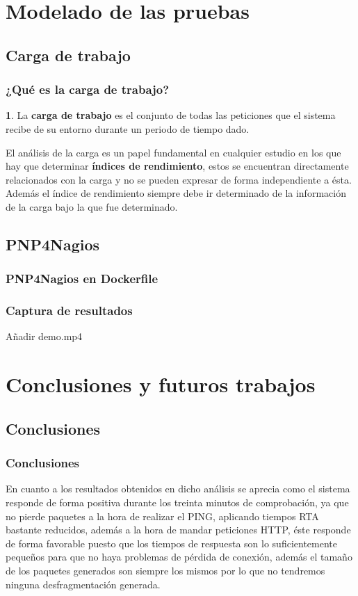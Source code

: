 \documentclass{beamer}
\theoremstyle{plain}
\theoremstyle{definition}
\newtheorem{defn}[thm]{}
\theoremstyle{plain}
\theoremstyle{definition}
\theoremstyle{remark}
\theoremstyle{definition}
\begin{document}
\section{Modelado de las pruebas} %
\subsection{Carga de trabajo}
\begin{frame}
	\frametitle{¿Qué es la carga de trabajo?}
	\begin{defn}
		La \textbf{carga de trabajo} es el conjunto de todas las peticiones que el sistema recibe de su entorno
		durante un periodo de tiempo dado.
	\end{defn}
El análisis de la carga es un papel fundamental en cualquier
estudio en los que hay que determinar \textbf{índices de rendimiento}, estos se
encuentran directamente relacionados con la carga y no se pueden expresar
de forma independiente a ésta. Además el índice de rendimiento siempre debe
ir determinado de la información de la carga bajo la que fue determinado.
	
\end{frame}
\subsection{PNP4Nagios}

\begin{frame}
	\frametitle{PNP4Nagios en Dockerfile}
\end{frame}
\begin{frame}
	\frametitle{Captura de resultados}
	Añadir demo.mp4
\end{frame}


\section{Conclusiones y futuros trabajos}
\subsection{Conclusiones}
\begin{frame}
	\frametitle{Conclusiones}
	En cuanto a los resultados obtenidos en dicho análisis se aprecia
	como el sistema responde de forma positiva durante los treinta minutos de
	comprobación, ya que no pierde paquetes a la hora de realizar el PING,
	aplicando tiempos RTA bastante reducidos, además a la hora de mandar
	peticiones HTTP, éste responde de forma favorable puesto que los tiempos
	de respuesta son lo suficientemente pequeños para que no haya problemas
	de pérdida de conexión, además el tamaño de los paquetes generados son
	siempre los mismos por lo que no tendremos ninguna desfragmentación generada.
	
\end{frame}
\end{document}
